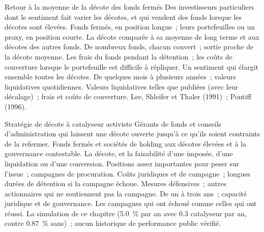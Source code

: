\begin{strategyfile}{Retour à la moyenne de la décote des fonds fermés}\label{strat:s1:share-classes-holding-companies-closed-end-funds-spacs:cef}
 Des investisseurs particuliers dont le sentiment fait varier les décotes, et qui vendent des fonds lorsque les décotes sont élevées.
 Fonds fermés, en position longue~; leurs portefeuilles ou un proxy, en position courte.
 La décote comparée à sa moyenne de long terme et aux décotes des autres fonds.
 De nombreux fonds, chacun couvert~; sortie proche de la décote moyenne.
 Les frais du fonds pendant la détention~; les coûts de couverture lorsque le portefeuille est difficile à répliquer.
 Un sentiment qui élargit ensemble toutes les décotes.
 De quelques mois à plusieurs années~; valeurs liquidatives quotidiennes.
 Valeurs liquidatives telles que publiées (avec leur décalage)~; frais et coûts de couverture.
 Lee, Shleifer et Thaler (1991)~; Pontiff (1996).
\end{strategyfile}

\begin{strategyfile}{Stratégie de décote à catalyseur activiste}\label{strat:s1:share-classes-holding-companies-closed-end-funds-spacs:activist}
 Gérants de fonds et conseils d'administration qui laissent une décote ouverte jusqu'à ce qu'ils soient contraints de la refermer.
 Fonds fermés et sociétés de holding aux décotes élevées et à la gouvernance contestable.
 La décote, et la faisabilité d'une  imposée, d'une liquidation ou d'une conversion.
 Positions assez importantes pour peser sur l'issue~; campagnes de procuration.
 Coûts juridiques et de campagne~; longues durées de détention si la campagne échoue.
 Mesures défensives~; autres actionnaires qui ne soutiennent pas la campagne.
 De un à trois ans~; capacité juridique et de gouvernance.
 Les campagnes qui ont échoué comme celles qui ont réussi.
 La simulation de ce chapitre (5.0~\% par an avec 0.3 catalyseur par an, contre 0.87~\% sans)~; aucun historique de performance public vérifié.
\end{strategyfile}

